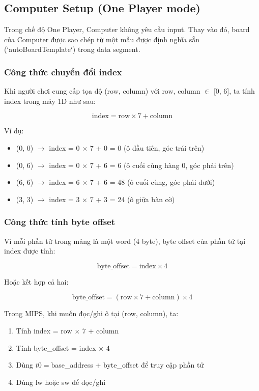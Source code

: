\subsection{Computer Setup (One Player mode)}

Trong chế độ One Player, Computer không yêu cầu input. Thay vào đó, board của Computer được sao chép từ một mẫu được định nghĩa sẵn (`autoBoardTemplate`) trong data segment.


\subsubsection{Công thức chuyển đổi index}

Khi người chơi cung cấp tọa độ (row, column) với row, column $\in$ [0, 6], ta tính index trong mảy 1D như sau:

\begin{equation}
\text{index} = \text{row} \times 7 + \text{column}
\end{equation}

Ví dụ:
\begin{itemize}
    \item (0, 0) $\rightarrow$ index = 0 $\times$ 7 + 0 = 0 (ô đầu tiên, góc trái trên)
    \item (0, 6) $\rightarrow$ index = 0 $\times$ 7 + 6 = 6 (ô cuối cùng hàng 0, góc phải trên)
    \item (6, 6) $\rightarrow$ index = 6 $\times$ 7 + 6 = 48 (ô cuối cùng, góc phải dưới)
    \item (3, 3) $\rightarrow$ index = 3 $\times$ 7 + 3 = 24 (ô giữa bàn cờ)
\end{itemize}

\subsubsection{Công thức tính byte offset}

Vì mỗi phần tử trong mảng là một word (4 byte), byte offset của phần tử tại index được tính:

\begin{equation}
\text{byte\_offset} = \text{index} \times 4
\end{equation}

Hoặc kết hợp cả hai:

\begin{equation}
\text{byte\_offset} = (\text{row} \times 7 + \text{column}) \times 4
\end{equation}

Trong MIPS, khi muốn đọc/ghi ô tại (row, column), ta:
\begin{enumerate}
    \item Tính index = row $\times$ 7 + column
    \item Tính byte\_offset = index $\times$ 4
    \item Dùng $t0 = $base\_address + byte\_offset để truy cập phần tử
    \item Dùng lw hoặc sw để đọc/ghi
\end{enumerate}

